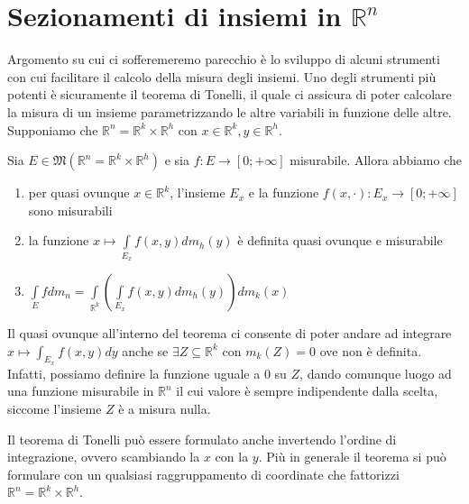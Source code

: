 \section{Sezionamenti di insiemi in $\mathbb{R}^n$}
Argomento su cui ci sofferemeremo parecchio è lo sviluppo di alcuni strumenti con cui facilitare il calcolo della misura degli insiemi. Uno degli strumenti
più potenti è sicuramente il teorema di Tonelli, il quale ci assicura di poter calcolare la misura di un insieme parametrizzando le altre variabili in funzione delle altre. \\
Supponiamo che $\mathbb{R}^n = \mathbb{R}^k \times \mathbb{R}^h$ con $x \in \mathbb{R}^k, y \in \mathbb{R}^h$.
%
\vspace{0.5cm}
\begin{theorem}[\textcolor{blue}{di Tonelli}]
	Sia $E \in \mathfrak{M}(\mathbb{R}^n = \mathbb{R}^k \times \mathbb{R}^h)$ e sia $f: E \to [0; +\infty]$ misurabile. Allora abbiamo che
	\begin{enumerate}[label=\protect\circled{\arabic*}]
		\item per quasi ovunque $x \in \mathbb{R}^k$, l'insieme $E_x$ e la funzione $f(x, \cdot): E_x \to [0; +\infty]$ sono misurabili
		\item la funzione $x \mapsto \int\limits_{E_x} f(x, y)dm_h(y)$ è definita quasi ovunque e misurabile
		\item $\int\limits_E f dm_n = \int\limits_{\mathbb{R}^k}(\int\limits_{E_x} f(x, y)dm_h(y))dm_k(x)$ 
	\end{enumerate}
\end{theorem}
%
\begin{remark}
	Il quasi ovunque all'interno del teorema ci consente di poter andare ad integrare $x \mapsto \int_{E_x} f(x, y)dy$ anche se $\exists Z \subseteq \mathbb{R}^k$ con $m_k(Z) = 0$ ove non è definita. Infatti,
	possiamo definire la funzione uguale a $0$ su $Z$, dando comunque luogo ad una funzione misurabile in $\mathbb{R}^n$ il cui valore è sempre indipendente dalla scelta, siccome l'insieme $Z$ è a misura nulla.
\end{remark}
%
\begin{remark}
	Il teorema di Tonelli può essere formulato anche invertendo l'ordine di integrazione, ovvero scambiando la $x$ con la $y$. Più in generale il teorema si può formulare con un qualsiasi raggruppamento di coordinate che fattorizzi
	$\mathbb{R}^n = \mathbb{R}^k \times \mathbb{R}^h$.
\end{remark}
%
\vspace{0.5cm}
